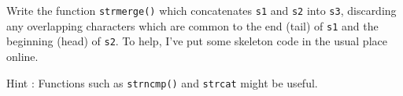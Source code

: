 
\toohard 

\begin{exercise}
Write the function \verb^strmerge()^ which concatenates \verb^s1^ and \verb^s2^ into \verb^s3^,
discarding any overlapping characters which are common to the end (tail) of \verb^s1^ and the 
beginning (head) of \verb^s2^.
To help, I've put some skeleton code in the usual place online.

Hint : Functions such as \verb^strncmp()^ and \verb^strcat^ might be useful.
\end{exercise}
